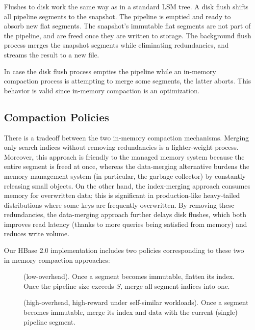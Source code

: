 Flushes to disk work the same way as in a standard LSM tree. A disk flush shifts all pipeline segments to the snapshot. The pipeline is emptied and ready to absorb new flat segments. The snapshot's immutable flat segments are not part of the pipeline, and are freed once they are written to storage. The background flush process merges the snapshot
segments while eliminating  redundancies, and streams the result to a new file. 

In case the disk flush process empties the pipeline while an in-memory compaction process is attempting to merge some segments, the latter aborts.  This behavior is valid since in-memory compaction is an optimization.

\subsection{Compaction Policies} \label{ssec:policies}

There is a tradeoff between the two in-memory compaction mechanisms. Merging only search indices without removing redundancies is a lighter-weight process.  Moreover, this approach is friendly to the managed memory system because the entire segment is freed at once, whereas 
the data-merging alternative burdens the memory management system (in particular, the garbage collector) by
constantly releasing small objects. On the other hand, the index-merging approach  
consumes memory for overwritten data; this is significant in production-like heavy-tailed distributions where some keys are frequently overwritten.
By removing these redundancies, the data-merging approach further delays disk flushes, which both improves read latency  (thanks to more 
queries being satisfied from memory) and reduces write volume.

Our HBase 2.0 implementation includes two policies corresponding to these two in-memory compaction approaches:
\begin{description}
\item[\basic] (low-overhead). Once a segment becomes immutable, flatten its index. Once the pipeline size exceeds $S$, 
merge all segment indices into one.  
\item[\eager] (high-overhead, high-reward under self-similar workloads). 
Once a segment becomes immutable, merge its index and data with the current (single) pipeline segment.
\end{description}

